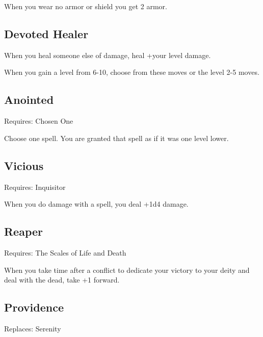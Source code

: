 When you wear no armor or shield you get 2 armor.

         
\subsection{Devoted Healer}    
         

When you heal someone else of damage, heal +your level damage.

         
\startInstructions
When you gain a level from 6-10, choose from these moves or the level 2-5 moves.
\stopInstructions
         
\subsection{Anointed}   
         

Requires: Chosen One

         

Choose one spell. You are granted that spell as if it was one level lower.

         
\subsection{Vicious}   
         

Requires: Inquisitor

         

When you do damage with a spell, you deal +1d4 damage.

         
\subsection{Reaper}   
         

Requires: The Scales of Life and Death

         

When you take time after a conflict to dedicate your victory to your deity and deal with the dead, take +1 forward.

         
\subsection{Providence}   
         

Replaces: Serenity

         

